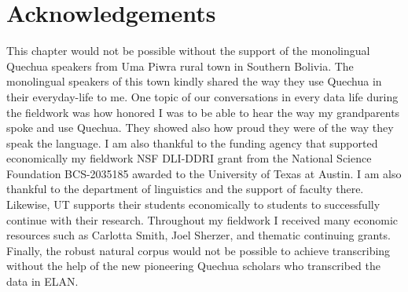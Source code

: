 \documentclass[output=paper]{langscibook}
\begin{document}
\section*{Acknowledgements}
This chapter would not be possible without the support of the monolingual Quechua speakers from Uma Piwra rural town in Southern Bolivia. The monolingual speakers of this town kindly shared the way they use Quechua in their everyday-life to me. One topic of our conversations in every data life during the fieldwork was how honored I was to be able to hear the way my grandparents spoke and use Quechua. They showed also how proud they were of the way they speak the language.
I am also thankful to the funding agency that supported economically my fieldwork NSF DLI-DDRI grant from the National Science Foundation BCS-2035185 awarded to the University of Texas at Austin.
I am also thankful to the department of linguistics and the support of faculty there.  Likewise, UT supports their students economically to students to successfully continue with their research. Throughout my fieldwork I received many economic resources such as Carlotta Smith, Joel Sherzer, and thematic continuing grants. 
Finally, the robust natural corpus would not be possible to achieve transcribing without the help of the new pioneering Quechua scholars who transcribed the data in ELAN. 

\printglossary

\printbibliography[heading=subbibliography,notkeyword=this]
\end{document}
